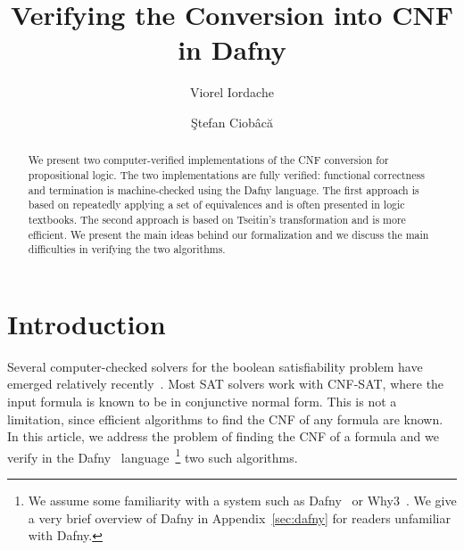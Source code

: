 \documentclass[12pt]{report}
\title{Verifying the Conversion into CNF in Dafny}
\author{Viorel Iordache \and
\c{S}tefan Ciob\^{a}c\u{a}}
\begin{document}
\maketitle     

\begin{abstract}

  We present two computer-verified implementations of the CNF
  conversion for propositional logic. The two implementations are
  fully verified: functional correctness and termination is
  machine-checked using the Dafny language. The first approach is
  based on repeatedly applying a set of equivalences and is often
  presented in logic textbooks. The second approach is based on
  Tseitin's transformation and is more efficient. We present the main
  ideas behind our formalization and we discuss the main difficulties
  in verifying the two algorithms.

\end{abstract}

\section{Introduction}

Several computer-checked solvers for the boolean satisfiability
problem have emerged relatively
recently~\cite{DBLP:journals/jar/Maric09,DBLP:conf/vmcai/OeSOC12,DBLP:journals/jar/BlanchetteFLW18,DBLP:conf/nfm/Fleury19}. Most
SAT solvers work with CNF-SAT, where the input formula is known to be
in conjunctive normal form. This is not a limitation, since efficient
algorithms to find the CNF of any formula are known. In this article,
we address the problem of finding the CNF of a formula and we verify
in the Dafny~\cite{DBLP:conf/icse/Leino04} language~\footnote{We
  assume some familiarity with a system such as
  Dafny~\cite{DBLP:conf/icse/Leino04} or Why3~\cite{why3}. We give a
  very brief overview of Dafny in Appendix~\ref{sec:dafny} for readers
  unfamiliar with Dafny.} two such algorithms.
\end{document}
